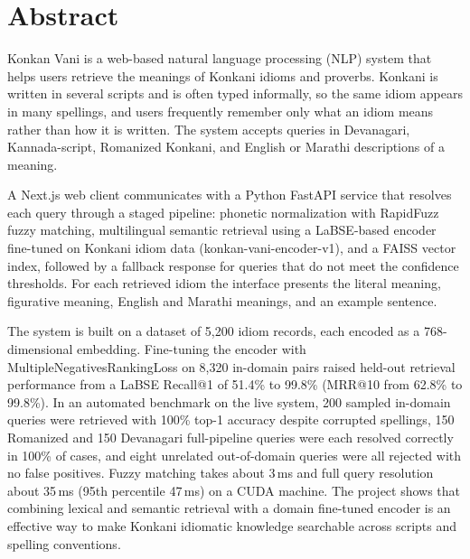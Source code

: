 \documentclass[12pt,a4paper]{article}
\let\oldsection\section
\renewcommand{\section}{\clearpage\oldsection}
\begin{document}
\section*{\centering Abstract}

\vspace{0.5cm}
\begin{justify}
Konkan Vani is a web-based natural language processing (NLP) system that helps users retrieve the meanings of Konkani idioms and proverbs. Konkani is written in several scripts and is often typed informally, so the same idiom appears in many spellings, and users frequently remember only what an idiom means rather than how it is written. The system accepts queries in Devanagari, Kannada-script, Romanized Konkani, and English or Marathi descriptions of a meaning.

A Next.js web client communicates with a Python FastAPI service that resolves each query through a staged pipeline: phonetic normalization with RapidFuzz fuzzy matching, multilingual semantic retrieval using a LaBSE-based encoder fine-tuned on Konkani idiom data (konkan-vani-encoder-v1), and a FAISS vector index, followed by a fallback response for queries that do not meet the confidence thresholds. For each retrieved idiom the interface presents the literal meaning, figurative meaning, English and Marathi meanings, and an example sentence.

The system is built on a dataset of 5,200 idiom records, each encoded as a 768-dimensional embedding. Fine-tuning the encoder with MultipleNegativesRankingLoss on 8,320 in-domain pairs raised held-out retrieval performance from a LaBSE Recall@1 of 51.4\% to 99.8\% (MRR@10 from 62.8\% to 99.8\%). In an automated benchmark on the live system, 200 sampled in-domain queries were retrieved with 100\% top-1 accuracy despite corrupted spellings, 150 Romanized and 150 Devanagari full-pipeline queries were each resolved correctly in 100\% of cases, and eight unrelated out-of-domain queries were all rejected with no false positives. Fuzzy matching takes about 3\,ms and full query resolution about 35\,ms (95th percentile 47\,ms) on a CUDA machine. The project shows that combining lexical and semantic retrieval with a domain fine-tuned encoder is an effective way to make Konkani idiomatic knowledge searchable across scripts and spelling conventions.
\end{justify}
\end{document}
